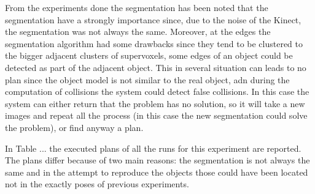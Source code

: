 From the experiments done the segmentation has been noted that the segmentation have a strongly importance since, due to the noise of the Kinect, the segmentation was not always the same. Moreover, at the edges the segmentation algorithm had some drawbacks since they tend to be clustered to the bigger adjacent clusters of supervoxels, some edges of an object could be detected as part of the adjacent object. This in several situation can leads to no plan since the object model is not similar to the real object, adn during the computation of collisions the system could detect false collisions. In this case the system can either return that the problem has no solution, so it will take a new images and repeat all the process (in this case the new segmentation could solve the problem), or find anyway a plan.  

In Table ... the executed plans of all the runs for this experiment are reported. The plans differ because of two main reasons: the segmentation is not always the same and in the attempt to reproduce the objects those could have been located not in the exactly poses of previous experiments. 



